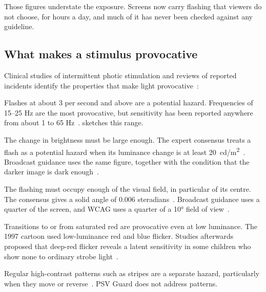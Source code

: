 \documentclass[11pt,a4paper]{article}
\newcommand{\guard}{PSV Guard}
\begin{document}
Those figures understate the exposure. Screens now carry flashing that viewers do not choose, for hours a day, and much of it has never been checked against any guideline.

\subsection{What makes a stimulus provocative}

Clinical studies of intermittent photic stimulation and reviews of reported incidents identify the properties that make light provocative~\cite{fisher2005review,harding2005,fisher2022}:

\begin{description}[font=\bfseries\color{ink}]
  \item[Frequency.] Flashes at about 3 per second and above are a potential hazard. Frequencies of 15--25 Hz are the most provocative, but sensitivity has been reported anywhere from about 1 to 65 Hz~\cite{fisher2005review}.  sketches this range.
  \item[Intensity.] The change in brightness must be large enough. The expert consensus treats a flash as a potential hazard when its luminance change is at least \SI{20}{cd/m^2}~\cite{harding2005}. Broadcast guidance uses the same figure, together with the condition that the darker image is dark enough~\cite{itu1702,ofcom}.
  \item[Area.] The flashing must occupy enough of the visual field, in particular of its centre. The consensus gives a solid angle of 0.006 steradians~\cite{harding2005}. Broadcast guidance uses a quarter of the screen, and WCAG uses a quarter of a \ang{10} field of view~\cite{wcag22}.
  \item[Colour.] Transitions to or from saturated red are provocative even at low luminance. The 1997 cartoon used low-luminance red and blue flicker. Studies afterwards proposed that deep-red flicker reveals a latent sensitivity in some children who show none to ordinary strobe light~\cite{takahashi1998}.
  \item[Pattern.] Regular high-contrast patterns such as stripes are a separate hazard, particularly when they move or reverse~\cite{harding2005}. \guard{} does not address patterns.
\end{description}
\end{document}
